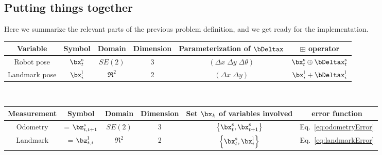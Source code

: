 \documentclass[a4paper]{article}
\begin{document}
\subsection{Putting things together}
Here we summarize the relevant parts of the previous problem definition,
and we get ready for the implementation.\\[.3em]
{\small
\begin{tabular}{|c|c|c|c|c|c|}
\hline
\textbf{Variable} & \textbf{Symbol}  & \textbf{Domain} & \textbf{Dimension} & \textbf{Parameterization of }$\bDeltax$   & $\boxplus$ \textbf{operator} \\
\hline
Robot    pose     & $\bx^\mathrm{s}_t$ & $SE(2)$         & 3                  & $(\Delta x \; \Delta y \; \Delta\theta)$  & $\bx^\mathrm{s}_t \oplus \bDeltax^\mathrm{s}_t$ \\
\hline
Landmark pose     & $\bx^\mathrm{l}_i$ & $\Re^2$         & 2                  & $(\Delta x \; \Delta y )$                 & $\bx^\mathrm{l}_i + \bDeltax^\mathrm{l}_i$\\
\hline
\end{tabular}\\[.3em]
\begin{tabular}{|c|c|c|c|c|c|}
\hline
\textbf{Measurement} & \textbf{Symbol}         & \textbf{Domain} & \textbf{Dimension} & \textbf{Set $\bx_k$ of variables involved}             & \textbf{error function}\\
\hline
Odometry             & = $\bz^\mathrm{s}_{t,t+1}$ & $SE(2)$         & 3                  & $\left\{ \bx^\mathrm{s}_t, \bx^\mathrm{s}_{t+1} \right\}$ & Eq.~\ref{eq:odometryError} \\
\hline
Landmark             & = $\bz^\mathrm{l}_{t,i}$   & $\Re^2$         & 2                  & $\left\{ \bx^\mathrm{s}_t, \bx^\mathrm{l}_{i} \right\}$  & Eq.~\ref{eq:landmarkError} \\
\hline
\end{tabular}}\\[.3em]
\end{document}
